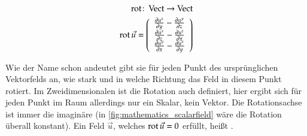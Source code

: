 \begin{equation}
\begin{aligned}
\operatorname*{rot} \colon \operatorname*{Vect} \to \operatorname*{Vect} \\
\operatorname*{rot} \vec{u}
=
\left(
	\begin{array}{c}
		\frac{\partial u^z}{\partial y} - \frac{\partial u^y}{\partial z} \\
		\frac{\partial u^x}{\partial z} - \frac{\partial u^z}{\partial x} \\
		\frac{\partial u^y}{\partial x} - \frac{\partial u^x}{\partial y}
	\end{array}
\right)
\end{aligned}
\end{equation}

Wie der Name schon andeutet gibt sie für jeden Punkt des
ursprünglichen Vektorfelds an, wie stark und in welche Richtung das
Feld in diesem Punkt rotiert. Im Zweidimensionalen ist die Rotation
auch definiert, hier ergibt sich für jeden Punkt im Raum allerdings
nur ein Skalar, kein Vektor. Die Rotationsachse ist immer die
imaginäre  (in
\autoref{fig:mathematics_scalarfield} wäre die Rotation überall
konstant). Ein Feld $\vec{u}$, welches $\operatorname*{rot} \vec{u}=0$
erfüllt, heißt .

